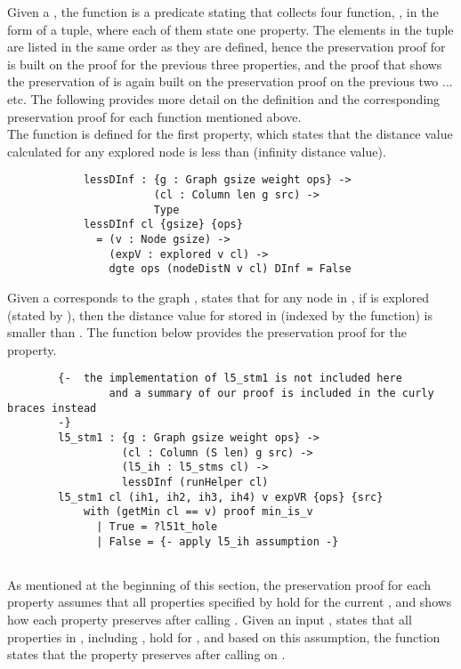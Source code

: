 Given a  , the function  is a predicate stating that collects four function, , in the form of a tuple, where each of them state one  property. The elements in the tuple are listed in the same order as they are defined, hence the preservation proof for  is built on the proof for the previous three properties, and the proof that shows the preservation of  is again built on the preservation proof on the previous two ... etc. The following provides more detail on the definition and the corresponding preservation proof for each function mentioned above. 
\\ 

The function  is defined for the first property, which states that the distance value calculated for any explored node is less than (infinity distance value).
\begin{lstlisting}
			lessDInf : {g : Graph gsize weight ops} ->
			           (cl : Column len g src) ->
			           Type
			lessDInf cl {gsize} {ops}
			  = (v : Node gsize) ->
			    (expV : explored v cl) ->
			    dgte ops (nodeDistN v cl) DInf = False
\end{lstlisting}

Given a   corresponds to the graph ,  states that for any node  in , if  is explored (stated by ), then the distance value for  stored in (indexed by the  function) is smaller than . The  function below provides the preservation proof for the  property. 
\begin{lstlisting}
		{-  the implementation of l5_stm1 is not included here 
				and a summary of our proof is included in the curly braces instead
		-}
		l5_stm1 : {g : Graph gsize weight ops} ->
		          (cl : Column (S len) g src) ->
		          (l5_ih : l5_stms cl) ->
		          lessDInf (runHelper cl)
		l5_stm1 cl (ih1, ih2, ih3, ih4) v expVR {ops} {src} 
			with (getMin cl == v) proof min_is_v
			  | True = ?l51t_hole
			  | False = {- apply l5_ih assumption -}
         
\end{lstlisting}

As mentioned at the beginning of this section, the preservation proof for each property assumes that all properties specified by  hold for the current , and shows how each property preserves after calling . Given an input ,  states that all properties in , including , hold for , and based on this assumption, the function  states that the  property preserves after calling  on .
\\

